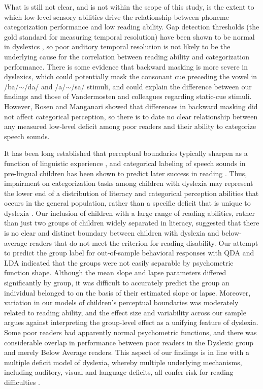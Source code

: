 \documentclass[../uwthesis.tex]{subfiles}
\begin{document}
What is still not clear, and is not within the scope of this study, is the extent to which low-level sensory abilities drive the relationship between phoneme categorization performance and low reading ability. Gap detection thresholds (the gold standard for measuring temporal resolution) have been shown to be normal in dyslexics \citep{Adlard1998,Boets2007,McAnally1997,Schulte-Korne1998}, so poor auditory temporal resolution is not likely to be the underlying cause for the correlation between reading ability and categorization performance. There is some evidence that backward masking is more severe in dyslexics\citep{Wright1997}, which could potentially mask the consonant cue preceding the vowel in /ba/$\sim$/da/ and /a/$\sim$/sa/ stimuli, and could explain the difference between our findings and those of Vandermosten and colleagues regarding static-cue stimuli. However, Rosen and Manganari \citep{Rosen2001} showed that differences in backward masking did not affect categorical perception, so there is to date no clear relationship between any measured low-level deficit among poor readers and their ability to categorize speech sounds. 

It has been long established that perceptual boundaries typically sharpen as a function of linguistic experience \citep{Garnica1973}, and categorical labeling of speech sounds in pre-lingual children has been shown to predict later success in reading \citep{Bradley1983}. Thus, impairment on categorization tasks among children with dyslexia may represent the lower end of a distribution of literacy and categorical perception abilities that occurs in the general population, rather than a specific deficit that is unique to dyslexia \citep{Shaywitz1992}. Our inclusion of children with a large range of reading abilities, rather than just two groups of children widely separated in literacy, suggested that there is no clear and distinct boundary between children with dyslexia and below-average readers that do not meet the criterion for reading disability. Our attempt to predict the group label for out-of-sample behavioral responses with QDA and LDA indicated that the groups were not easily separable by psychometric function shape. Although the mean slope and lapse parameters differed significantly by group, it was difficult to accurately predict the group an individual belonged to on the basis of their estimated slope or lapse. Moreover, variation in our models of children’s perceptual boundaries was moderately related to reading ability, and the effect size and variability across our sample argues against interpreting the group-level effect as a unifying feature of dyslexia. Some poor readers had apparently normal psychometric functions, and there was considerable overlap in performance between poor readers in the Dyslexic group and merely Below Average readers.  This aspect of our findings is in line with a multiple deficit model of dyslexia, whereby multiple underlying mechanisms, including auditory, visual and language deficits, all confer risk for reading difficulties \citep{Joo2017,Joo2017a,Pennington2006,Peterson2015}.
\end{document}
